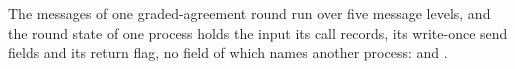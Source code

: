 \begin{definition}
  \label{def:aba-round-messages}
  \leanok
  The messages of one graded-agreement round run over five message levels, and the round state of one process holds the input its call records, its write-once send fields and its return flag, no field of which names another process:  and .
\end{definition}
